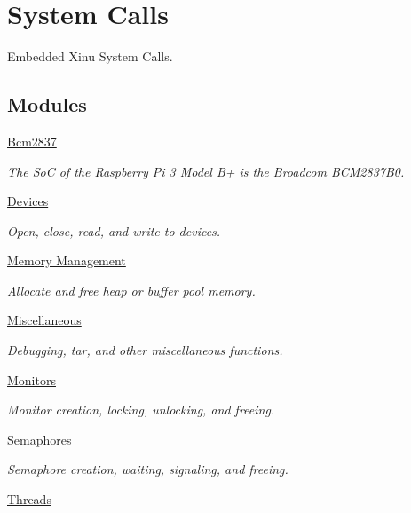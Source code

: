 \hypertarget{group__system}{\section{System Calls}
\label{group__system}
}


Embedded Xinu System Calls.  


\subsection*{Modules}
\begin{DoxyCompactItemize}
\item 
\hyperlink{group__bcm2837}{Bcm2837}
\begin{DoxyCompactList}\small\item\em The So\-C of the Raspberry Pi 3 Model B+ is the Broadcom B\-C\-M2837\-B0. \end{DoxyCompactList}\item 
\hyperlink{group__devcalls}{Devices}
\begin{DoxyCompactList}\small\item\em Open, close, read, and write to devices. \end{DoxyCompactList}\item 
\hyperlink{group__memory__mgmt}{Memory Management}
\begin{DoxyCompactList}\small\item\em Allocate and free heap or buffer pool memory. \end{DoxyCompactList}\item 
\hyperlink{group__misc}{Miscellaneous}
\begin{DoxyCompactList}\small\item\em Debugging, tar, and other miscellaneous functions. \end{DoxyCompactList}\item 
\hyperlink{group__monitors}{Monitors}
\begin{DoxyCompactList}\small\item\em Monitor creation, locking, unlocking, and freeing. \end{DoxyCompactList}\item 
\hyperlink{group__semaphores}{Semaphores}
\begin{DoxyCompactList}\small\item\em Semaphore creation, waiting, signaling, and freeing. \end{DoxyCompactList}\item 
\hyperlink{group__threads}{Threads}

\end{DoxyCompactItemize}
